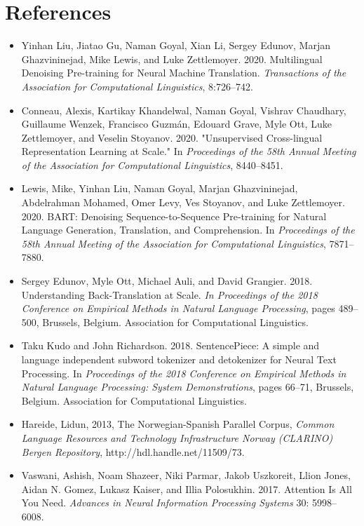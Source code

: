 \documentclass[11pt]{article}
\begin{document}
\section*{References} 
\begin{itemize}
    \item Yinhan Liu, Jiatao Gu, Naman Goyal, Xian Li, Sergey Edunov, Marjan Ghazvininejad, Mike Lewis, and Luke Zettlemoyer. 2020. Multilingual Denoising Pre-training for Neural Machine Translation. \textit{Transactions of the Association for Computational Linguistics}, 8:726–742.
    \item Conneau, Alexis, Kartikay Khandelwal, Naman Goyal, Vishrav Chaudhary, Guillaume Wenzek, Francisco Guzmán, Edouard Grave, Myle Ott, Luke Zettlemoyer, and Veselin Stoyanov. 2020. "Unsupervised Cross-lingual Representation Learning at Scale." In \textit{Proceedings of the 58th Annual Meeting of the Association for Computational Linguistics}, 8440--8451.
    \item Lewis, Mike, Yinhan Liu, Naman Goyal, Marjan Ghazvininejad, Abdelrahman Mohamed, Omer Levy, Ves Stoyanov, and Luke Zettlemoyer. 2020. BART: Denoising Sequence-to-Sequence Pre-training for Natural Language Generation, Translation, and Comprehension. In \textit{Proceedings of the 58th Annual Meeting of the Association for Computational Linguistics}, 7871–7880.
    \item Sergey Edunov, Myle Ott, Michael Auli, and David Grangier. 2018. Understanding Back-Translation at Scale. \textit{In Proceedings of the 2018 Conference on Empirical Methods in Natural Language Processing}, pages 489–500, Brussels, Belgium. Association for Computational Linguistics.
    \item Taku Kudo and John Richardson. 2018. SentencePiece: A simple and language independent subword tokenizer and detokenizer for Neural Text Processing. In \textit{Proceedings of the 2018 Conference on Empirical Methods in Natural Language Processing: System Demonstrations}, pages 66–71, Brussels, Belgium. Association for Computational Linguistics.
    \item Hareide, Lidun, 2013, The Norwegian-Spanish Parallel Corpus, \textit{Common Language Resources and Technology Infrastructure Norway (CLARINO) Bergen Repository}, http://hdl.handle.net/11509/73.
    \item Vaswani, Ashish, Noam Shazeer, Niki Parmar, Jakob Uszkoreit, Llion Jones, Aidan N. Gomez, Lukasz Kaiser, and Illia Polosukhin. 2017. Attention Is All You Need. \textit{Advances in Neural Information Processing Systems} 30: 5998–6008.
\end{itemize}
\end{document}
